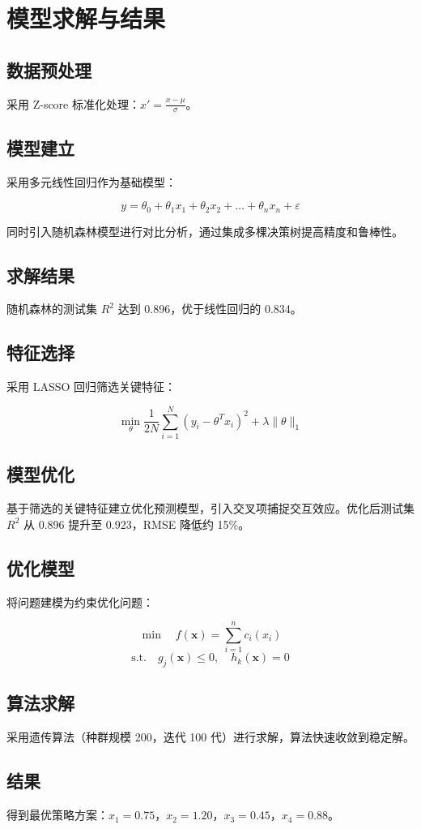 \section{模型求解与结果}

\subsection{数据预处理}

采用 Z-score 标准化处理：$x' = \frac{x - \mu}{\sigma}$。

\subsection{模型建立}

采用多元线性回归作为基础模型：

\[
  y = \theta_0 + \theta_1 x_1 + \theta_2 x_2 + \dots + \theta_n x_n + \varepsilon
\]

同时引入随机森林模型进行对比分析，通过集成多棵决策树提高精度和鲁棒性。

\subsection{求解结果}

随机森林的测试集 $R^2$ 达到 0.896，优于线性回归的 0.834。

\subsection{特征选择}

采用 LASSO 回归筛选关键特征：

\[
  \min_{\theta} \frac{1}{2N} \sum_{i=1}^{N} (y_i - \theta^T x_i)^2 + \lambda \|\theta\|_1
\]

\subsection{模型优化}

基于筛选的关键特征建立优化预测模型，引入交叉项捕捉交互效应。优化后测试集 $R^2$ 从 0.896 提升至 0.923，RMSE 降低约 15\%。

\subsection{优化模型}

将问题建模为约束优化问题：

\[
  \min \quad f(\mathbf{x}) = \sum_{i=1}^{n} c_i(x_i)
\]
\[
  \text{s.t.} \quad g_j(\mathbf{x}) \leq 0, \quad h_k(\mathbf{x}) = 0
\]

\subsection{算法求解}

采用遗传算法（种群规模 200，迭代 100 代）进行求解，算法快速收敛到稳定解。

\subsection{结果}

得到最优策略方案：$x_1 = 0.75$，$x_2 = 1.20$，$x_3 = 0.45$，$x_4 = 0.88$。
